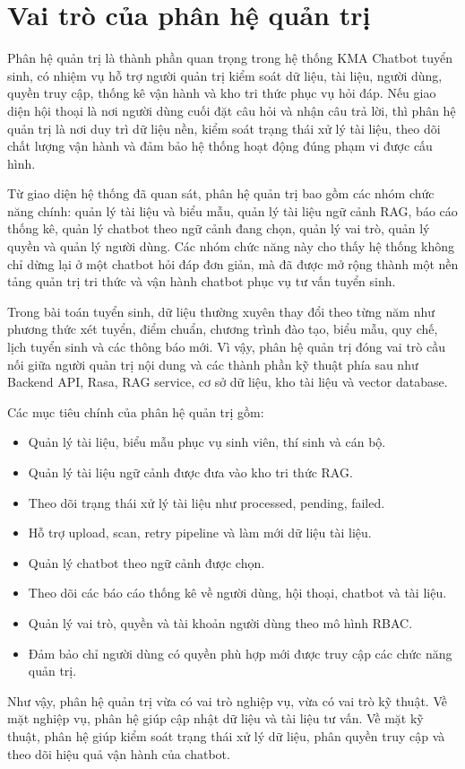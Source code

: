 \section{Vai trò của phân hệ quản trị}

Phân hệ quản trị là thành phần quan trọng trong hệ thống KMA Chatbot tuyển sinh, có nhiệm vụ hỗ trợ người quản trị kiểm soát dữ liệu, tài liệu, người dùng, quyền truy cập, thống kê vận hành và kho tri thức phục vụ hỏi đáp. Nếu giao diện hội thoại là nơi người dùng cuối đặt câu hỏi và nhận câu trả lời, thì phân hệ quản trị là nơi duy trì dữ liệu nền, kiểm soát trạng thái xử lý tài liệu, theo dõi chất lượng vận hành và đảm bảo hệ thống hoạt động đúng phạm vi được cấu hình.

Từ giao diện hệ thống đã quan sát, phân hệ quản trị bao gồm các nhóm chức năng chính: quản lý tài liệu và biểu mẫu, quản lý tài liệu ngữ cảnh RAG, báo cáo thống kê, quản lý chatbot theo ngữ cảnh đang chọn, quản lý vai trò, quản lý quyền và quản lý người dùng. Các nhóm chức năng này cho thấy hệ thống không chỉ dừng lại ở một chatbot hỏi đáp đơn giản, mà đã được mở rộng thành một nền tảng quản trị tri thức và vận hành chatbot phục vụ tư vấn tuyển sinh.

Trong bài toán tuyển sinh, dữ liệu thường xuyên thay đổi theo từng năm như phương thức xét tuyển, điểm chuẩn, chương trình đào tạo, biểu mẫu, quy chế, lịch tuyển sinh và các thông báo mới. Vì vậy, phân hệ quản trị đóng vai trò cầu nối giữa người quản trị nội dung và các thành phần kỹ thuật phía sau như Backend API, Rasa, RAG service, cơ sở dữ liệu, kho tài liệu và vector database.

Các mục tiêu chính của phân hệ quản trị gồm:

\begin{itemize}
    \item Quản lý tài liệu, biểu mẫu phục vụ sinh viên, thí sinh và cán bộ.
    \item Quản lý tài liệu ngữ cảnh được đưa vào kho tri thức RAG.
    \item Theo dõi trạng thái xử lý tài liệu như processed, pending, failed.
    \item Hỗ trợ upload, scan, retry pipeline và làm mới dữ liệu tài liệu.
    \item Quản lý chatbot theo ngữ cảnh được chọn.
    \item Theo dõi các báo cáo thống kê về người dùng, hội thoại, chatbot và tài liệu.
    \item Quản lý vai trò, quyền và tài khoản người dùng theo mô hình RBAC.
    \item Đảm bảo chỉ người dùng có quyền phù hợp mới được truy cập các chức năng quản trị.
\end{itemize}

Như vậy, phân hệ quản trị vừa có vai trò nghiệp vụ, vừa có vai trò kỹ thuật. Về mặt nghiệp vụ, phân hệ giúp cập nhật dữ liệu và tài liệu tư vấn. Về mặt kỹ thuật, phân hệ giúp kiểm soát trạng thái xử lý dữ liệu, phân quyền truy cập và theo dõi hiệu quả vận hành của chatbot.
